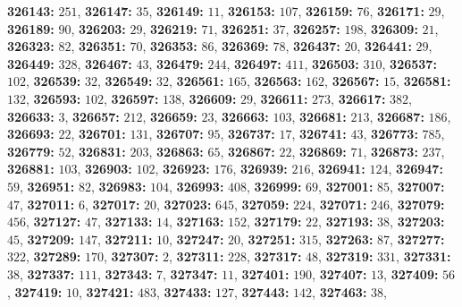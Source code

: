 \textsf{\bfseries 326143:} $251$, \textsf{\bfseries 326147:} $35$, \textsf{\bfseries 326149:} $11$, \textsf{\bfseries 326153:} $107$, \textsf{\bfseries 326159:} $76$, \textsf{\bfseries 326171:} $29$, \textsf{\bfseries 326189:} $90$, \textsf{\bfseries 326203:} $29$, \textsf{\bfseries 326219:} $71$, \textsf{\bfseries 326251:} $37$, \textsf{\bfseries 326257:} $198$, \textsf{\bfseries 326309:} $21$, \textsf{\bfseries 326323:} $82$, \textsf{\bfseries 326351:} $70$, \textsf{\bfseries 326353:} $86$, \textsf{\bfseries 326369:} $78$, \textsf{\bfseries 326437:} $20$, \textsf{\bfseries 326441:} $29$, \textsf{\bfseries 326449:} $328$, \textsf{\bfseries 326467:} $43$, \textsf{\bfseries 326479:} $244$, \textsf{\bfseries 326497:} $411$, \textsf{\bfseries 326503:} $310$, \textsf{\bfseries 326537:} $102$, \textsf{\bfseries 326539:} $32$, \textsf{\bfseries 326549:} $32$, \textsf{\bfseries 326561:} $165$, \textsf{\bfseries 326563:} $162$, \textsf{\bfseries 326567:} $15$, \textsf{\bfseries 326581:} $132$, \textsf{\bfseries 326593:} $102$, \textsf{\bfseries 326597:} $138$, \textsf{\bfseries 326609:} $29$, \textsf{\bfseries 326611:} $273$, \textsf{\bfseries 326617:} $382$, \textsf{\bfseries 326633:} $3$, \textsf{\bfseries 326657:} $212$, \textsf{\bfseries 326659:} $23$, \textsf{\bfseries 326663:} $103$, \textsf{\bfseries 326681:} $213$, \textsf{\bfseries 326687:} $186$, \textsf{\bfseries 326693:} $22$, \textsf{\bfseries 326701:} $131$, \textsf{\bfseries 326707:} $95$, \textsf{\bfseries 326737:} $17$, \textsf{\bfseries 326741:} $43$, \textsf{\bfseries 326773:} $785$, \textsf{\bfseries 326779:} $52$, \textsf{\bfseries 326831:} $203$, \textsf{\bfseries 326863:} $65$, \textsf{\bfseries 326867:} $22$, \textsf{\bfseries 326869:} $71$, \textsf{\bfseries 326873:} $237$, \textsf{\bfseries 326881:} $103$, \textsf{\bfseries 326903:} $102$, \textsf{\bfseries 326923:} $176$, \textsf{\bfseries 326939:} $216$, \textsf{\bfseries 326941:} $124$, \textsf{\bfseries 326947:} $59$, \textsf{\bfseries 326951:} $82$, \textsf{\bfseries 326983:} $104$, \textsf{\bfseries 326993:} $408$, \textsf{\bfseries 326999:} $69$, \textsf{\bfseries 327001:} $85$, \textsf{\bfseries 327007:} $47$, \textsf{\bfseries 327011:} $6$, \textsf{\bfseries 327017:} $20$, \textsf{\bfseries 327023:} $645$, \textsf{\bfseries 327059:} $224$, \textsf{\bfseries 327071:} $246$, \textsf{\bfseries 327079:} $456$, \textsf{\bfseries 327127:} $47$, \textsf{\bfseries 327133:} $14$, \textsf{\bfseries 327163:} $152$, \textsf{\bfseries 327179:} $22$, \textsf{\bfseries 327193:} $38$, \textsf{\bfseries 327203:} $45$, \textsf{\bfseries 327209:} $147$, \textsf{\bfseries 327211:} $10$, \textsf{\bfseries 327247:} $20$, \textsf{\bfseries 327251:} $315$, \textsf{\bfseries 327263:} $87$, \textsf{\bfseries 327277:} $322$, \textsf{\bfseries 327289:} $170$, \textsf{\bfseries 327307:} $2$, \textsf{\bfseries 327311:} $228$, \textsf{\bfseries 327317:} $48$, \textsf{\bfseries 327319:} $331$, \textsf{\bfseries 327331:} $38$, \textsf{\bfseries 327337:} $111$, \textsf{\bfseries 327343:} $7$, \textsf{\bfseries 327347:} $11$, \textsf{\bfseries 327401:} $190$, \textsf{\bfseries 327407:} $13$, \textsf{\bfseries 327409:} $56$, \textsf{\bfseries 327419:} $10$, \textsf{\bfseries 327421:} $483$, \textsf{\bfseries 327433:} $127$, \textsf{\bfseries 327443:} $142$, \textsf{\bfseries 327463:} $38$, 
